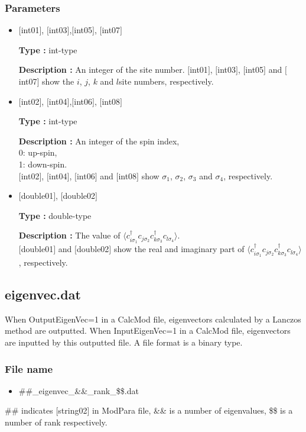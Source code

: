 \subsubsection{Parameters}
 \begin{itemize}

 \item  $[$int01$]$, $[$int03$]$,$[$int05$]$, $[$int07$]$

 {\bf Type :} int-type

{\bf Description :} 
An integer of the site number. $[$int01$]$, $[$int03$]$, $[$int05$]$ and $[$int07$]$  show the $i$, $j$, $k$ and $l$site numbers, respectively.
 
  \item  $[$int02$]$, $[$int04$]$,$[$int06$]$, $[$int08$]$

 {\bf Type :} int-type 

{\bf Description :} An integer of the spin index,\\
   0: up-spin,\\
   1: down-spin.\\ 
$[$int02$]$, $[$int04$]$, $[$int06$]$ and $[$int08$]$ show $\sigma_1$, $\sigma_2$, $\sigma_3$ and $\sigma_4$,  respectively. 

 \item  $[$double01$]$, $[$double02$]$

 {\bf Type :} double-type 

{\bf Description :} The value of $\langle c_{i\sigma_1}^{\dagger}c_{j\sigma_2}c_{k\sigma_3}^{\dagger}c_{l\sigma_4}\rangle$.\\
$[$double01$]$ and $[$double02$]$ show the real and imaginary part of $\langle c_{i\sigma_1}^{\dagger}c_{j\sigma_2}c_{k\sigma_3}^{\dagger}c_{l\sigma_4}\rangle$, respectively.

\end{itemize}

\newpage
\subsection{eigenvec.dat}
\label{Subsec:eigenvec}
When OutputEigenVec=1 in a CalcMod file, eigenvectors calculated by a Lanczos method are outputted. When InputEigenVec=1 in a CalcMod file, eigenvectors are inputted by this outputted file. A file format is a binary type. 

\subsubsection{File name}
\begin{itemize}
   \item{\#\#\_eigenvec\_{\&\&}\_rank\_{\$\$}.dat}
\end{itemize}
  \#\# indicates [string02] in ModPara file, \&\& is a number of eigenvalues, \$\$ is a number of rank respectively.


